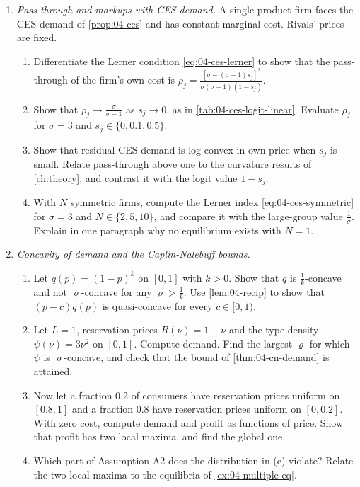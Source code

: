\begin{enumerate}[label=\arabic*., leftmargin=*, itemsep=6pt]
\item \textit{Pass-through and markups with CES demand.} A single-product firm faces the CES demand of
\cref{prop:04-ces} and has constant marginal cost. Rivals' prices are fixed.
\begin{enumerate}[label=(\alph*)]
  \item Differentiate the Lerner condition \eqref{eq:04-ces-lerner} to show that the pass-through of the firm's own
  cost is $\rho_j = \frac{[\sigma - (\sigma - 1)s_j]^2}{\sigma(\sigma - 1)(1 - s_j)}$.
  \item Show that $\rho_j \to \frac{\sigma}{\sigma - 1}$ as $s_j \to 0$, as in \cref{tab:04-ces-logit-linear}.
  Evaluate $\rho_j$ for $\sigma = 3$ and $s_j \in \{0, 0.1, 0.5\}$.
  \item Show that residual CES demand is log-convex in own price when $s_j$ is small. Relate pass-through above one
  to the curvature results of \cref{ch:theory}, and contrast it with the logit value $1 - s_j$.
  \item With $N$ symmetric firms, compute the Lerner index \eqref{eq:04-ces-symmetric} for $\sigma = 3$ and
  $N \in \{2, 5, 10\}$, and compare it with the large-group value $\frac{1}{\sigma}$. Explain in one paragraph why no
  equilibrium exists with $N = 1$.
\end{enumerate}

\item \textit{Concavity of demand and the Caplin-Nalebuff bounds.}
\begin{enumerate}[label=(\alph*)]
  \item Let $q(p) = (1 - p)^k$ on $[0, 1]$ with $k > 0$. Show that $q$ is $\frac{1}{k}$-concave and not $\varrho$-concave for
  any $\varrho > \frac{1}{k}$. Use \cref{lem:04-recip} to show that $(p - c)q(p)$ is quasi-concave for every $c \in [0, 1)$.
  \item Let $L = 1$, reservation prices $R(\nu) = 1 - \nu$ and the type density $\psi(\nu) = 3\nu^2$ on $[0, 1]$.
  Compute demand. Find the largest $\varrho$ for which $\psi$ is $\varrho$-concave, and check that the bound of
  \cref{thm:04-cn-demand} is attained.
  \item Now let a fraction 0.2 of consumers have reservation prices uniform on $[0.8, 1]$ and a fraction 0.8 have
  reservation prices uniform on $[0, 0.2]$. With zero cost, compute demand and profit as functions of price. Show
  that profit has two local maxima, and find the global one.
  \item Which part of Assumption A2 does the distribution in (c) violate? Relate the two local maxima to the
  equilibria of \cref{ex:04-multiple-eq}.
\end{enumerate}


\end{enumerate}
